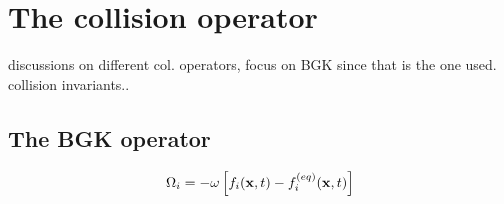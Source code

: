 \section{The collision operator}\label{sec:lbm:col}
discussions on different col. operators, focus on BGK since that is
the one used. collision invariants..

\subsection{The BGK operator}

\begin{equation}\label{eq:lbm:bgk}
\Omega_i = -\omega \left[ f_i(\mathbf{x}, t) - f_i^{(eq)}(\mathbf{x}, t) \right]
\end{equation}
